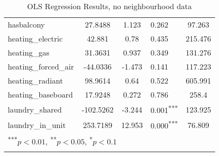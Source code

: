 \documentclass[12pt]{report}
\begin{document}
\begin{longtable}{l S[table-format=6.4] S[table-format=3.4] l S[table-format=4.4]}
	hasbalcony                   & 27.8488              & 1.123            & 0.262                      & 97.263                            \\
	heating\_electric            & 42.881               & 0.78             & 0.435                      & 215.476                           \\
	heating\_gas                 & 31.3631              & 0.937            & 0.349                      & 131.276                           \\
	heating\_forced\_air         & -44.0336             & -1.473           & 0.141                      & 117.223                           \\
	heating\_radiant             & 98.9614              & 0.64             & 0.522                      & 605.991                           \\
	heating\_baseboard           & 17.9248              & 0.272            & 0.786                      & 258.4                             \\
	laundry\_shared              & -102.5262            & -3.244           & 0.001\textsuperscript{***} & 123.925                           \\
	laundry\_in\_unit            & 253.7189             & 12.953           & 0.000\textsuperscript{***} & 76.809                            \\
	                             \\
	\caption{OLS Regression Results, no neighbourhood data}
	\label{table:ols_with_neighbourhood}
\end{longtable}
\end{document}
